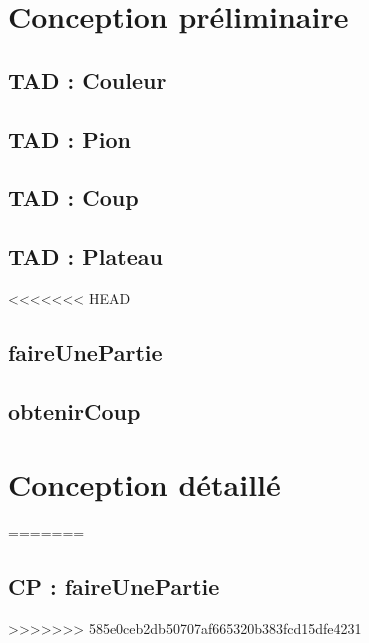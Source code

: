 \documentclass{article}
\begin{document}
\section{Conception préliminaire}

\subsection{TAD : Couleur}


\subsection{TAD : Pion}


\subsection{TAD : Coup}


\subsection{TAD : Plateau}


<<<<<<< HEAD
\subsection{faireUnePartie}



\subsection{obtenirCoup}





\section{Conception détaillé}

=======
\subsection{CP : faireUnePartie}

>>>>>>> 585e0ceb2db50707af665320b383fcd15dfe4231
\end{document}
